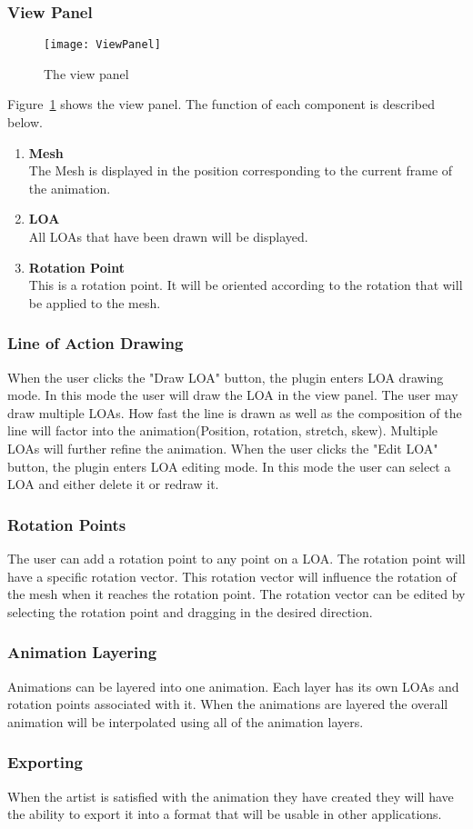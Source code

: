 \subsubsection{View Panel}
\begin{figure}[H]
\centering
\texttt{[image: ViewPanel]}
\caption{The view panel}
\label{fig:viewPanel}
\end{figure}
Figure~\ref{fig:viewPanel} shows the view panel.  The function of each component is described below.
\begin{enumerate}
	\item \textbf{Mesh} \hfill \\
		The Mesh is displayed in the position corresponding to the current frame of the animation.
	\item \textbf{LOA} \hfill \\
		All LOAs that have been drawn will be displayed.
	\item \textbf{Rotation Point} \hfill \\
		This is a rotation point.  It will be oriented according to the rotation that will be applied to the mesh.
\end{enumerate}
\subsubsection{Line of Action Drawing}
	When the user clicks the "Draw LOA" button, the plugin enters LOA drawing mode.  In this mode the user will draw the LOA in the view panel.  The user may draw multiple LOAs.  How fast the line is drawn as well as the composition of the line will factor into the animation(Position, rotation, stretch, skew).  Multiple LOAs will further refine the animation.
	When the user clicks the "Edit LOA" button, the plugin enters LOA editing mode.  In this mode the user can select a LOA and either delete it or redraw it.
\subsubsection{Rotation Points}
	The user can add a rotation point to any point on a LOA.  The rotation point will have a specific rotation vector.  This rotation vector will influence the rotation of the mesh when it reaches the rotation point.  The rotation vector can be edited by selecting the rotation point and dragging in the desired direction.
\subsubsection{Animation Layering}
	Animations can be layered into one animation.  Each layer has its own LOAs and rotation points associated with it.  When the animations are layered the overall animation will be interpolated using all of the animation layers.
\subsubsection{Exporting}
	When the artist is satisfied with the animation they have created they will have the ability to export it into a format that will be usable in other applications.

